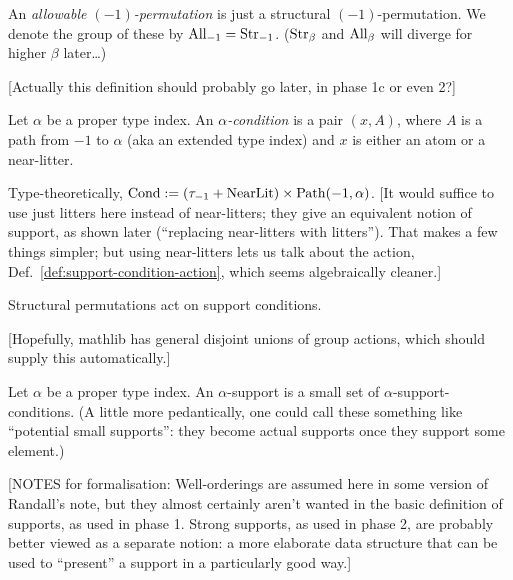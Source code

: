 \begin{definition}
  \label{def:allowable-perm-atoms}
  An \emph{allowable $(-1)$-permutation} is just a structural $(-1)$-permutation. We denote the group of these by $\mathrm{All}_{-1} = \mathrm{Str}_{-1}$.  ($\mathrm{Str}_\beta$ and $\mathrm{All}_\beta$ will diverge for higher $\beta$ later…)

  [Actually this definition should probably go later, in phase 1c or even 2?]
\end{definition}

\begin{definition}
  \label{def:support-condition}
  \leanok
  Let $\alpha$ be a proper type index. An \emph{$\alpha$-condition} is a pair $(x,A)$, where $A$ is a path from $-1$ to $\alpha$ (aka an extended type index) and $x$ is either an atom or a near-litter.

  Type-theoretically, $\mathrm{Cond} := (\tau_{-1} + \mathrm{NearLit}) \times \mathrm{Path}(-1,\alpha)$.
  [It would suffice to use just litters here instead of near-litters; they give an equivalent notion of support, as shown later (“replacing near-litters with litters”).  That makes a few things simpler; but using near-litters lets us talk about the action, Def.~\ref{def:support-condition-action}, which seems algebraically cleaner.]
\end{definition}

\begin{definition}
  \label{def:support-condition-action}

  Structural permutations act on support conditions.

  [Hopefully, mathlib has general disjoint unions of group actions, which should supply this automatically.]
\end{definition}

\begin{definition}
\label{def:support}
\leanok
Let $\alpha$ be a proper type index. An $\alpha$-support is a small set of $\alpha$-support-conditions.  (A little more pedantically, one could call these something like “potential small supports”: they become actual supports once they support some element.)

[NOTES for formalisation: Well-orderings are assumed here in some version of Randall’s note, but they almost certainly aren’t wanted in the basic definition of supports, as used in phase 1. Strong supports, as used in phase 2, are probably better viewed as a separate notion: a more elaborate data structure that can be used to “present” a support in a particularly good way.]
\end{definition}

